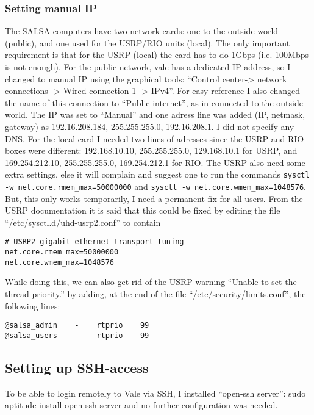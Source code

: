 \subsubsection{Setting manual IP}
The SALSA computers have two network cards: one to the outside world (public),
and one used for the USRP/RIO units (local). The only important requirement is
that for the USRP (local) the card has to do 1Gbps (i.e. 100Mbps is not
enough). For the public network, vale has a dedicated IP-address, so I changed
to manual IP using the graphical tools: “Control center-> network connections
-> Wired connection 1 -> IPv4”. For easy reference I also changed the name of
this connection to “Public internet”, as in connected to the outside world. The
IP was set to “Manual” and one adress line was added (IP, netmask, gateway) as
192.16.208.184, 255.255.255.0, 192.16.208.1. I did not specify any DNS. For the
local card I needed two lines of adresses since the USRP and RIO boxes were
different: 192.168.10.10, 255.255.255.0, 129.168.10.1 for USRP, and
169.254.212.10, 255.255.255.0, 169.254.212.1 for RIO.  The USRP also need some
extra settings, else it will complain and suggest one to run the commands 
\verb!sysctl -w net.core.rmem_max=50000000! and 
\verb!sysctl -w net.core.wmem_max=1048576!. But, this only works
temporarily, I need a permanent fix for all users. From the USRP documentation
it is said that this could be fixed by editing the file
“/etc/sysctl.d/uhd-usrp2.conf” to contain
\begin{verbatim}
# USRP2 gigabit ethernet transport tuning
net.core.rmem_max=50000000
net.core.wmem_max=1048576
\end{verbatim}
While doing this, we can also get rid of the USRP warning “Unable to set the
thread priority.” by adding, at the end of the file
“/etc/security/limits.conf”, the following lines: 
\begin{verbatim}
@salsa_admin    -    rtprio    99
@salsa_users    -    rtprio    99
\end{verbatim}

\subsection{Setting up SSH-access}
To be able to login remotely to Vale via SSH, I installed “open-ssh server”:
sudo aptitude install open-ssh server and no further configuration was needed. 

